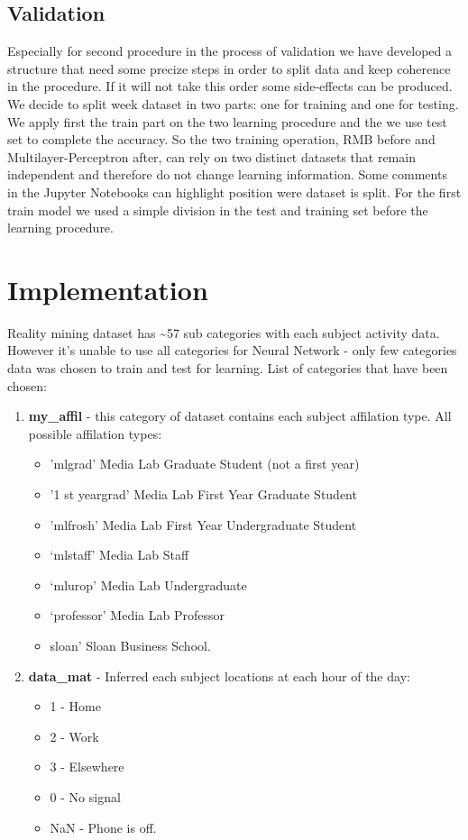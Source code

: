 \documentclass[paper=letter, fontsize=12pt]{article}
\begin{document}
\subsection{Validation}
Especially for second procedure in the process of validation we have developed a structure that need some precize steps in order to split data and keep coherence in the procedure. If it will not take this order some side-effects can be produced.\newline
We decide to split week dataset in two parts: one for training and one for testing. We apply first the train part on the two learning procedure and the we use test set to complete the accuracy.\newline
So the two training operation, RMB before and Multilayer-Perceptron after, can rely on two distinct datasets that remain independent and therefore do not change learning information. Some comments in the Jupyter Notebooks can highlight position were dataset is split.\newline
For the first train model we used a simple division in the test and training set before the learning procedure.
\section{Implementation}
Reality mining dataset has \textasciitilde{}57 sub categories with each subject activity data. However it's unable to use all categories for Neural Network - only few categories data was chosen to train and test for learning.
List of categories that have been chosen:
\begin{enumerate}
\item \textbf{my\_affil} - this category of dataset contains each subject affilation type. All possible affilation types:
 \begin{itemize}
 	\item 'mlgrad' \textendash{} Media Lab Graduate Student (not a first year)
 	\item'1 st yeargrad' \textendash{} Media Lab First Year Graduate Student
 	\item'mlfrosh' \textendash{} Media Lab First Year Undergraduate Student
 	\item`mlstaff' \textendash{} Media Lab Staff
 	\item`mlurop' \textendash{} Media Lab Undergraduate
 	\item`professor' \textendash{} Media Lab Professor
 	\item sloan' \textendash{} Sloan Business School.
 \end{itemize}
\item \textbf{data\_mat} - Inferred each subject locations at each hour of the day:
 \begin{itemize}
 	\item 1 - Home
 	\item 2 - Work
 	\item 3 - Elsewhere
 	\item 0 - No signal
 	\item NaN - Phone is off.
 \end{itemize}
 \end{enumerate}
\end{document}
